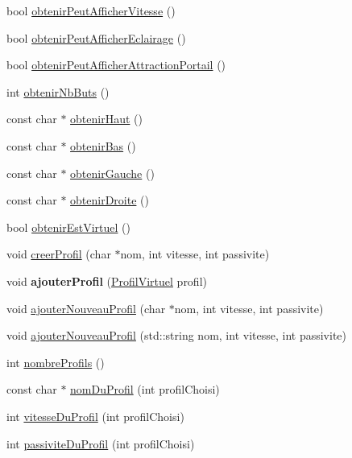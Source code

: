 \begin{DoxyCompactItemize}
bool \hyperlink{group__inf2990_ga89d12aa893262cc19dda94de7685e05e}{obtenir\+Peut\+Afficher\+Vitesse} ()
\item 
bool \hyperlink{group__inf2990_ga471c6fd7ba07062b8a831f6cef8eec8b}{obtenir\+Peut\+Afficher\+Eclairage} ()
\item 
bool \hyperlink{group__inf2990_gae7fee4c771d7e99f5973a52c2c53f929}{obtenir\+Peut\+Afficher\+Attraction\+Portail} ()
\item 
int \hyperlink{group__inf2990_ga2711a3dfeea35df137399bf9b70a8e8f}{obtenir\+Nb\+Buts} ()
\item 
const char $\ast$ \hyperlink{group__inf2990_gab24e8855fff89b6b216380d4411c162b}{obtenir\+Haut} ()
\item 
const char $\ast$ \hyperlink{group__inf2990_gaa0586d36dcf7754f4faf63a98bc9616d}{obtenir\+Bas} ()
\item 
const char $\ast$ \hyperlink{group__inf2990_ga2e822ac6b12a0cd2583ee2f7dbeb7a60}{obtenir\+Gauche} ()
\item 
const char $\ast$ \hyperlink{group__inf2990_gad6525ab642196854615ecdb3313ddd8b}{obtenir\+Droite} ()
\item 
bool \hyperlink{group__inf2990_gafa3ae8eed6176af302d3b1f20143a49c}{obtenir\+Est\+Virtuel} ()
\item 
void \hyperlink{group__inf2990_ga23b1fe16682e55d35d633bf939110343}{creer\+Profil} (char $\ast$nom, int vitesse, int passivite)
\item 
void {\bfseries ajouter\+Profil} (\hyperlink{class_profil_virtuel}{Profil\+Virtuel} profil)
\item 
void \hyperlink{group__inf2990_gaf4579c0cd1f6a30d196cbcee74dab4d1}{ajouter\+Nouveau\+Profil} (char $\ast$nom, int vitesse, int passivite)
\item 
void \hyperlink{group__inf2990_ga13743b58c50d8b9d5d0b924999003667}{ajouter\+Nouveau\+Profil} (std\+::string nom, int vitesse, int passivite)
\item 
int \hyperlink{group__inf2990_ga416b992be6a5d386f20356137a7dfc04}{nombre\+Profils} ()
\item 
const char $\ast$ \hyperlink{group__inf2990_ga48f8514c50e91412a9a5f8b1b31608c4}{nom\+Du\+Profil} (int profil\+Choisi)
\item 
int \hyperlink{group__inf2990_gae52e8b966494531bb39eeaf38fbe835d}{vitesse\+Du\+Profil} (int profil\+Choisi)
\item 
int \hyperlink{group__inf2990_gad374d0e071223157ade5a26000147fee}{passivite\+Du\+Profil} (int profil\+Choisi)
\item 

\end{DoxyCompactItemize}

